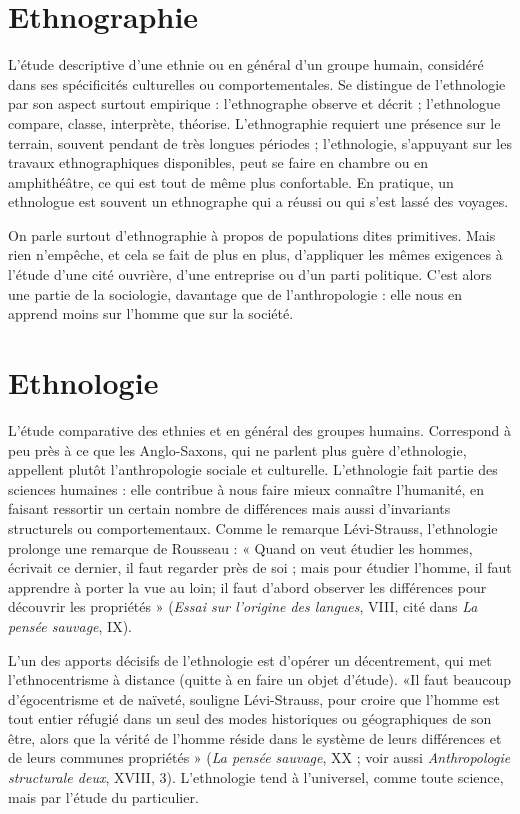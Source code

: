 \section{Ethnographie}
L’étude descriptive d’une ethnie ou en général d’un
groupe humain, considéré dans ses spécificités culturelles
ou comportementales. Se distingue de l’ethnologie par son aspect surtout
empirique : l’ethnographe observe et décrit ; l’ethnologue compare, classe,
interprète, théorise. L’ethnographie requiert une présence sur le terrain, souvent
pendant de très longues périodes ; l’ethnologie, s'appuyant sur les travaux
ethnographiques disponibles, peut se faire en chambre ou en amphithéâtre, ce
qui est tout de même plus confortable. En pratique, un ethnologue est souvent
un ethnographe qui a réussi ou qui s’est lassé des voyages.

On parle surtout d’ethnographie à propos de populations dites primitives.
Mais rien n'empêche, et cela se fait de plus en plus, d’appliquer les mêmes exigences
à l’étude d’une cité ouvrière, d’une entreprise ou d’un parti politique.
C’est alors une partie de la sociologie, davantage que de l’anthropologie : elle
nous en apprend moins sur l’homme que sur la société.

\section{Ethnologie}
L'étude comparative des ethnies et en général des groupes
humains. Correspond à peu près à ce que les Anglo-Saxons,
qui ne parlent plus guère d’ethnologie, appellent plutôt l’anthropologie sociale
et culturelle. L’ethnologie fait partie des sciences humaines : elle contribue à
nous faire mieux connaître l'humanité, en faisant ressortir un certain nombre
de différences mais aussi d’invariants structurels ou comportementaux.
Comme le remarque Lévi-Strauss, l’ethnologie prolonge une remarque de
Rousseau : « Quand on veut étudier les hommes, écrivait ce dernier, il faut
regarder près de soi ; mais pour étudier l’homme, il faut apprendre à porter la
vue au loin; il faut d’abord observer les différences pour découvrir les
propriétés » ({\it Essai sur l'origine des langues}, VIII, cité dans {\it La pensée sauvage}, IX).

L’un des apports décisifs de l’ethnologie est d’opérer un décentrement, qui
met l’ethnocentrisme à distance (quitte à en faire un objet d’étude). «Il faut
beaucoup d’égocentrisme et de naïveté, souligne Lévi-Strauss, pour croire que
l’homme est tout entier réfugié dans un seul des modes historiques ou géographiques
de son être, alors que la vérité de l’homme réside dans le système de
leurs différences et de leurs communes propriétés » ({\it La pensée sauvage}, XX ; voir
aussi {\it Anthropologie structurale deux}, XVIII, 3). L’ethnologie tend à l’universel,
comme toute science, mais par l'étude du particulier.


